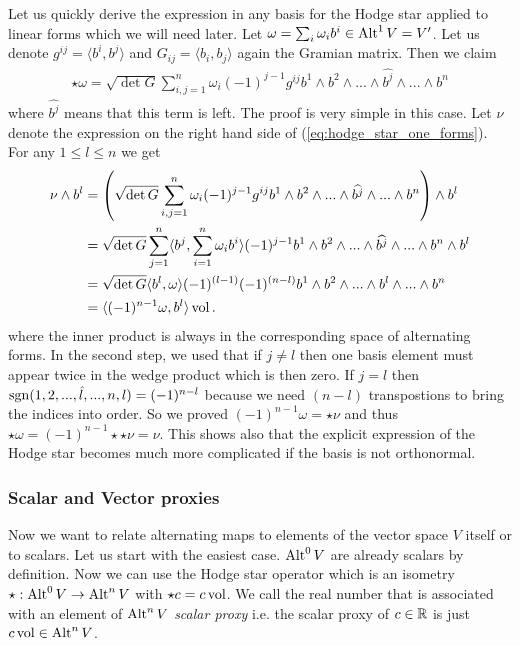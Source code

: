 \documentclass[../master_thesis.tex]{subfiles}
\begin{document}
Let us quickly derive the expression in any basis 
for the Hodge star applied to linear 
forms which we will need later. Let $\omega = \sum_i \omega_i b^i \in 
{\text{Alt}^{1}\,V} = V'$. Let us denote $g^{ij} = \langle b^i, b^j \rangle$ 
and $G_{ij} = \langle b_i, b_j \rangle$ again the Gramian matrix.
Then we claim
\begin{align}
    \star \omega = \sqrt{\det G} \sum_{i,j=1}^n \omega_i (-1)^{j-1} 
        g^{ij} b^1 \wedge
        b^2 \wedge ... \wedge \widehat{b^j}\wedge ... \wedge b^n 
        \label{eq:hodge_star_one_forms}
\end{align}
where $\widehat{b^j}$ means that this term is left. The proof is very 
simple in this case. Let $\nu$ denote the expression on the right hand side 
of (\ref{eq:hodge_star_one_forms}).
For any $1 \leq l \leq n$ we get
\begin{align*}
    \nu \wedge b^l &= \left( \sqrt{\det G} \sum_{i,j=1}^n \omega_i (-1)^{j-1} g^{ij} b^1 \wedge
        b^2 \wedge ... \wedge \widehat{b^j} \wedge ... \wedge b^n\right) \wedge b^l 
    \\ &= \sqrt{\det G} \sum_{j=1}^n \langle b^j,\sum_{i=1}^n \omega_i  b^i\rangle
        (-1)^{j-1}  b^1 \wedge
        b^2 \wedge ... \wedge \widehat{b^j} \wedge ... \wedge b^n \wedge b^l
    \\ &= \sqrt{\det G} \langle b^l,\omega \rangle
        (-1)^{(l-1)}(-1)^{(n-l)}  b^1 \wedge
        b^2 \wedge ... \wedge b^l  \wedge ... \wedge b^n 
    \\ &= \langle (-1)^{n-1}\omega, b^l \rangle \operatorname{vol}.
\end{align*}
where the inner product is always in the corresponding space of alternating forms.
In the second step, we used that if $j\neq l$ then one basis element must 
appear twice in the wedge product which is then zero. If $j=l$ then 
$\operatorname{sgn} (1,2, ..., \hat{l},...,n,l) = (-1)^{n-l}$ because we need $(n-l)$
transpostions to bring the indices into order. So we proved 
$(-1)^{n-1}\omega = \star \nu$ and thus $\star \omega = (-1)^{n-1} \star\star\nu = \nu$.
This shows also that the explicit expression of the Hodge star becomes much more 
complicated if the basis is not orthonormal.


\subsubsection{Scalar and Vector proxies} \label{sec:scalar_and_vector_proxies}
Now we want to relate alternating maps to elements of the 
vector space $V$ itself or to scalars. Let us start with the easiest 
case. ${\text{Alt}^{0}\,V}$ are already scalars by definition. Now we can use 
the Hodge star operator which is an isometry 
$\star: {\text{Alt}^{0}\,V} \rightarrow {\text{Alt}^{n}\,V}$ with
$\star c = c \operatorname{vol}$. 
We call the real number that is associated with an element of 
${\text{Alt}^{n}\,V}$ \textit{scalar proxy} i.e. the scalar proxy of 
$c \in \mathbb{R}$ is just $c \operatorname{vol} \in {\text{Alt}^{n}\,V}$.
\end{document}
